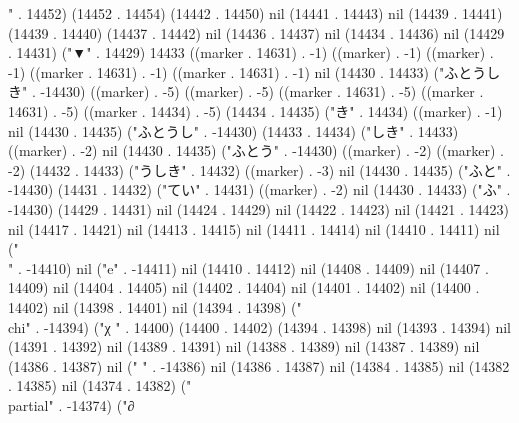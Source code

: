 " . 14452) (14452 . 14454) (14442 . 14450) nil (14441 . 14443) nil (14439 . 14441) (14439 . 14440) (14437 . 14442) nil (14436 . 14437) nil (14434 . 14436) nil (14429 . 14431) ("▼" . 14429) 14433 ((marker . 14631) . -1) ((marker) . -1) ((marker) . -1) ((marker . 14631) . -1) ((marker . 14631) . -1) nil (14430 . 14433) ("ふとうしき" . -14430) ((marker) . -5) ((marker) . -5) ((marker . 14631) . -5) ((marker . 14631) . -5) ((marker . 14434) . -5) (14434 . 14435) ("き" . 14434) ((marker) . -1) nil (14430 . 14435) ("ふとうし" . -14430) (14433 . 14434) ("しき" . 14433) ((marker) . -2) nil (14430 . 14435) ("ふとう" . -14430) ((marker) . -2) ((marker) . -2) (14432 . 14433) ("うしき" . 14432) ((marker) . -3) nil (14430 . 14435) ("ふと" . -14430) (14431 . 14432) ("てい" . 14431) ((marker) . -2) nil (14430 . 14433) ("ふ" . -14430) (14429 . 14431) nil (14424 . 14429) nil (14422 . 14423) nil (14421 . 14423) nil (14417 . 14421) nil (14413 . 14415) nil (14411 . 14414) nil (14410 . 14411) nil ("\\" . -14410) nil ("e" . -14411) nil (14410 . 14412) nil (14408 . 14409) nil (14407 . 14409) nil (14404 . 14405) nil (14402 . 14404) nil (14401 . 14402) nil (14400 . 14402) nil (14398 . 14401) nil (14394 . 14398) ("\\chi" . -14394) ("χ
" . 14400) (14400 . 14402) (14394 . 14398) nil (14393 . 14394) nil (14391 . 14392) nil (14389 . 14391) nil (14388 . 14389) nil (14387 . 14389) nil (14386 . 14387) nil (" " . -14386) nil (14386 . 14387) nil (14384 . 14385) nil (14382 . 14385) nil (14374 . 14382) ("\\partial" . -14374) ("∂
